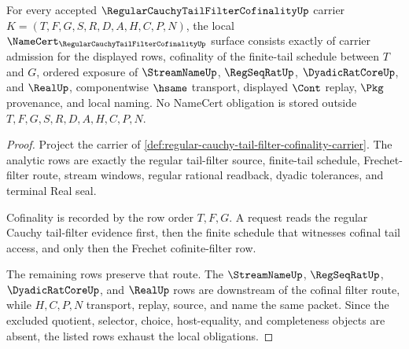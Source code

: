 \begin{theorem}
\label{thm:regular-cauchy-tail-filter-cofinality-namecert-obligations}
For every accepted $\RegularCauchyTailFilterCofinalityUp$ carrier $K=(T,F,G,S,R,D,A,H,C,P,N)$, the local $\NameCert_{\RegularCauchyTailFilterCofinalityUp}$ surface consists exactly of carrier admission for the displayed rows, cofinality of the finite-tail schedule between $T$ and $G$, ordered exposure of $\StreamNameUp$, $\RegSeqRatUp$, $\DyadicRatCoreUp$, and $\RealUp$, componentwise $\hsame$ transport, displayed $\Cont$ replay, $\Pkg$ provenance, and local naming. No NameCert obligation is stored outside $T,F,G,S,R,D,A,H,C,P,N$.
\end{theorem}
\begin{proof}
Project the carrier of \autoref{def:regular-cauchy-tail-filter-cofinality-carrier}. The analytic rows are exactly the regular tail-filter source, finite-tail schedule, Frechet-filter route, stream windows, regular rational readback, dyadic tolerances, and terminal Real seal.

Cofinality is recorded by the row order $T,F,G$. A request reads the regular Cauchy tail-filter evidence first, then the finite schedule that witnesses cofinal tail access, and only then the Frechet cofinite-filter row.

The remaining rows preserve that route. The $\StreamNameUp$, $\RegSeqRatUp$, $\DyadicRatCoreUp$, and $\RealUp$ rows are downstream of the cofinal filter route, while $H,C,P,N$ transport, replay, source, and name the same packet. Since the excluded quotient, selector, choice, host-equality, and completeness objects are absent, the listed rows exhaust the local obligations.
\end{proof}

